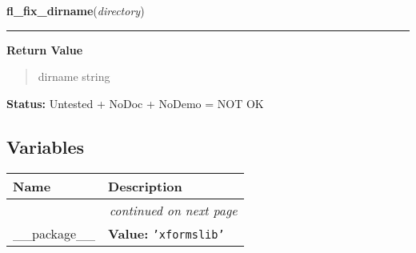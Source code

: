     \vspace{0.5ex}

\hspace{.8\funcindent}\begin{boxedminipage}{\funcwidth}

    \raggedright \textbf{fl\_fix\_dirname}(\textit{directory})

    \vspace{-1.5ex}

    \rule{\textwidth}{0.5\fboxrule}
\setlength{\parskip}{2ex}
\setlength{\parskip}{1ex}
      \textbf{Return Value}
    \vspace{-1ex}

      \begin{quote}
      dirname string

      \end{quote}

\textbf{Status:} Untested + NoDoc + NoDemo = NOT OK



    \end{boxedminipage}



  \subsection{Variables}

    \vspace{-1cm}
\hspace{\varindent}\begin{longtable}{|p{\varnamewidth}|p{\vardescrwidth}|l}
\cline{1-2}
\cline{1-2} \centering \textbf{Name} & \centering \textbf{Description}& \\
\cline{1-2}
\endhead\cline{1-2}\multicolumn{3}{r}{\small\textit{continued on next page}}\\\endfoot\cline{1-2}
\endlastfoot\raggedright \_\-\_\-p\-a\-c\-k\-a\-g\-e\-\_\-\_\- & \raggedright \textbf{Value:} 
{\tt \texttt{'}\texttt{xformslib}\texttt{'}}&\\
\cline{1-2}
\end{longtable}

